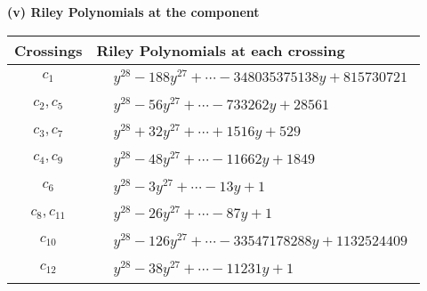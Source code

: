 \documentclass[1p]{elsarticle_modified}
\theoremstyle{definition}
\begin{document}
\newpage\renewcommand{\arraystretch}{1}
\flushleft \textbf{(v) Riley Polynomials at the component}\newline \\
\begin{tabular}{m{50pt}|m{274pt}}
Crossings & \hspace{64pt}Riley Polynomials at each crossing \\
\hline $$\begin{aligned}c_{1}\end{aligned}$$&$\begin{aligned}
&y^{28}-188 y^{27}+\cdots-348035375138 y+815730721
\end{aligned}$\\
\hline $$\begin{aligned}c_{2},c_{5}\end{aligned}$$&$\begin{aligned}
&y^{28}-56 y^{27}+\cdots-733262 y+28561
\end{aligned}$\\
\hline $$\begin{aligned}c_{3},c_{7}\end{aligned}$$&$\begin{aligned}
&y^{28}+32 y^{27}+\cdots+1516 y+529
\end{aligned}$\\
\hline $$\begin{aligned}c_{4},c_{9}\end{aligned}$$&$\begin{aligned}
&y^{28}-48 y^{27}+\cdots-11662 y+1849
\end{aligned}$\\
\hline $$\begin{aligned}c_{6}\end{aligned}$$&$\begin{aligned}
&y^{28}-3 y^{27}+\cdots-13 y+1
\end{aligned}$\\
\hline $$\begin{aligned}c_{8},c_{11}\end{aligned}$$&$\begin{aligned}
&y^{28}-26 y^{27}+\cdots-87 y+1
\end{aligned}$\\
\hline $$\begin{aligned}c_{10}\end{aligned}$$&$\begin{aligned}
&y^{28}-126 y^{27}+\cdots-33547178288 y+1132524409
\end{aligned}$\\
\hline $$\begin{aligned}c_{12}\end{aligned}$$&$\begin{aligned}
&y^{28}-38 y^{27}+\cdots-11231 y+1
\end{aligned}$\\
\hline
\end{tabular}\\~\\
\end{document}
